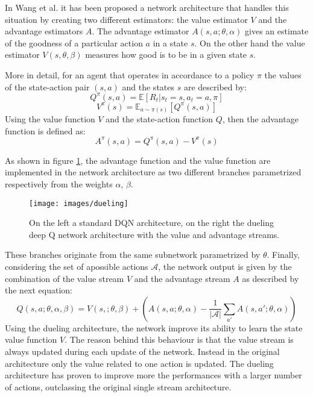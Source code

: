 \documentclass[article,11pt]{article}
\begin{document}
	In Wang et al. \cite{duelingdqn} it has been proposed a network architecture that handles this situation by creating two different estimators: the value estimator $V$ and the advantage estimators $A$. The advantage estimator $A(s,a;\theta,\alpha)$ gives an estimate of the goodness of a particular action $a$ in a state $s$. On the other hand the value estimator $V(s,\theta,\beta)$ measures how good is to be in a given state $s$.
	
	More in detail, for an agent that operates in accordance to a policy $\pi$ the values of the state-action pair $(s,a)$ and the states $s$ are described by:
	\begin{equation}
		Q^\pi(s,a) = \mathbb{E}\left[R_t | s_t = s, a_t = a, \pi \right]
	\end{equation}
	\begin{equation}
		V^\pi(s) = \mathbb{E}_{a\sim \pi(s)} \left[ Q^\pi(s,a)\right]
	\end{equation}
	Using the value function $V$ and the state-action function $Q$, then the advantage function is defined as:
	\begin{equation}
		A^\pi(s,a) = Q^\pi(s,a) - V^\pi(s)
	\end{equation}
	
	As shown in figure \ref{fig:dueling}, the advantage function and the value function are implemented in the network architecture as two different branches parametrized respectively from the weights $\alpha$, $\beta$.
	\begin{figure}
		\centering
		\texttt{[image: images/dueling]}
		\caption{On the left a standard DQN architecture, on the right the dueling deep Q network architecture with the value and advantage streams. }
		\label{fig:dueling}
	\end{figure}
	These branches originate from the same subnetwork parametrized by $\theta$.	Finally, considering the set of apossible actions $\mathcal{A}$, the network output is given by the combination of the value stream $V$ and the advantage stream $A$ as described by the next equation:
	\begin{equation}
		\label{eq:dueling}
		Q(s, a; \theta, \alpha, \beta) = V(s,;\theta, \beta) + \left( A(s,a;\theta,\alpha) - \dfrac{1}{|\mathcal{A}|} \sum_{a'}^{} A(s, a'; \theta,\alpha) \right)
	\end{equation}
	Using the dueling architecture, the network improve its ability to learn the state value function $V$. The reason behind this behaviour is that the value stream is always updated during each update of the network. Instead in the original architecture only the value related to one action is updated. The dueling architecture has proven to improve more the performances with a larger number of actions, outclassing the original single stream architecture.
	
\end{document}
